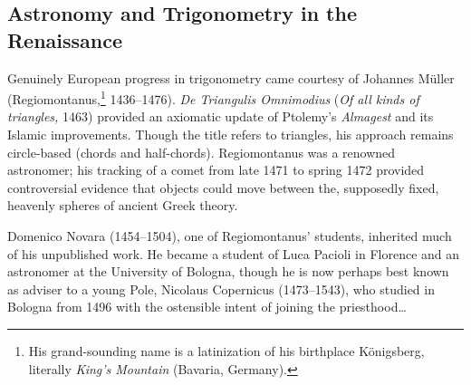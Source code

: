 \newpage

\subsection{Astronomy and Trigonometry in the Renaissance}

Genuinely European progress in trigonometry came courtesy of Johannes Müller  (Regiomontanus,\footnote{His grand-sounding name is a latinization of his birthplace Königsberg, literally \emph{King's Mountain} (Bavaria, Germany).} 1436--1476). \emph{De Triangulis Omnimodius} (\emph{Of all kinds of triangles,} 1463) provided an axiomatic update of Ptolemy's \emph{Almagest} and its Islamic improvements. Though the title refers to triangles, his approach remains circle-based (chords and half-chords). Regiomontanus was a renowned astronomer; his tracking of a comet from late 1471 to spring 1472 provided controversial evidence that objects could move between the, supposedly fixed, heavenly spheres of ancient Greek theory.\smallbreak

Domenico Novara (1454--1504), one of Regiomontanus' students, inherited much of his unpublished work. He became a student of Luca Pacioli in Florence and an astronomer at the University of Bologna, though he is now perhaps best known as adviser to a young Pole, Nicolaus Copernicus (1473--1543), who studied in Bologna from 1496 with the ostensible intent of joining the priesthood\ldots\par

